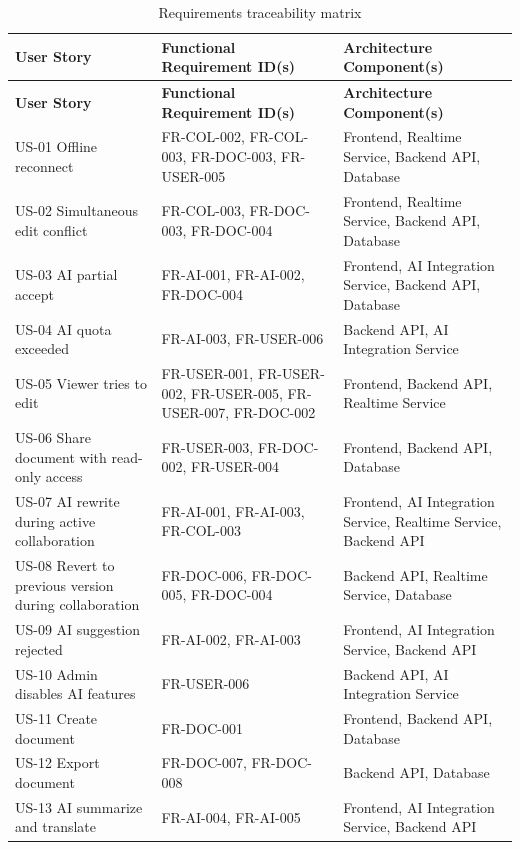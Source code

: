 \begin{landscape}
\begin{longtable}{p{3.4cm}p{5.6cm}p{8.2cm}}
\caption{Requirements traceability matrix}\label{tab:traceability}\\
\toprule
\textbf{User Story} & \textbf{Functional Requirement ID(s)} & \textbf{Architecture Component(s)} \\
\midrule
\endfirsthead
\toprule
\textbf{User Story} & \textbf{Functional Requirement ID(s)} & \textbf{Architecture Component(s)} \\
\midrule
\endhead
US-01 Offline reconnect & FR-COL-002, FR-COL-003, FR-DOC-003, FR-USER-005 & Frontend, Realtime Service, Backend API, Database \\
US-02 Simultaneous edit conflict & FR-COL-003, FR-DOC-003, FR-DOC-004 & Frontend, Realtime Service, Backend API, Database \\
US-03 AI partial accept & FR-AI-001, FR-AI-002, FR-DOC-004 & Frontend, AI Integration Service, Backend API, Database \\
US-04 AI quota exceeded & FR-AI-003, FR-USER-006 & Backend API, AI Integration Service \\
US-05 Viewer tries to edit & FR-USER-001, FR-USER-002, FR-USER-005, FR-USER-007, FR-DOC-002 & Frontend, Backend API, Realtime Service \\
US-06 Share document with read-only access & FR-USER-003, FR-DOC-002, FR-USER-004 & Frontend, Backend API, Database \\
US-07 AI rewrite during active collaboration & FR-AI-001, FR-AI-003, FR-COL-003 & Frontend, AI Integration Service, Realtime Service, Backend API \\
US-08 Revert to previous version during collaboration & FR-DOC-006, FR-DOC-005, FR-DOC-004 & Backend API, Realtime Service, Database \\
US-09 AI suggestion rejected & FR-AI-002, FR-AI-003 & Frontend, AI Integration Service, Backend API \\
US-10 Admin disables AI features & FR-USER-006 & Backend API, AI Integration Service \\
US-11 Create document & FR-DOC-001 & Frontend, Backend API, Database \\
US-12 Export document & FR-DOC-007, FR-DOC-008 & Backend API, Database \\
US-13 AI summarize and translate & FR-AI-004, FR-AI-005 & Frontend, AI Integration Service, Backend API \\
\bottomrule
\end{longtable}
\end{landscape}
